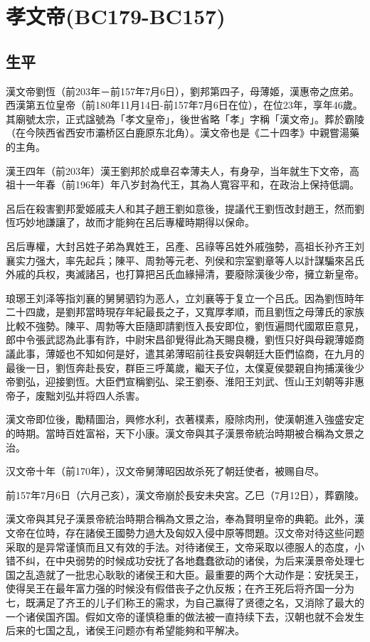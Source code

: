 
\section{孝文帝\tiny(BC179-BC157)}

\subsection{生平}

漢文帝劉恆（前203年－前157年7月6日），劉邦第四子，母薄姬，漢惠帝之庶弟。西漢第五位皇帝（前180年11月14日-前157年7月6日在位），在位23年，享年46歲。其廟號太宗，正式諡號為「孝文皇帝」，後世省略「孝」字稱「漢文帝」。葬於霸陵（在今陝西省西安市灞桥区白鹿原东北角）。漢文帝也是《二十四孝》中親嘗湯藥的主角。

漢王四年（前203年）漢王劉邦於成臯召幸薄夫人，有身孕，当年就生下文帝，高祖十一年春（前196年）年八岁封為代王，其為人寬容平和，在政治上保持低調。

呂后在殺害劉邦愛姬戚夫人和其子趙王劉如意後，提議代王劉恆改封趙王，然而劉恆巧妙地謙讓了，故而才能夠在呂后專權時期得以保命。

呂后專權，大封呂姓子弟為異姓王，呂產、呂祿等呂姓外戚強勢，高祖长孙齐王刘襄实力强大，率先起兵；陳平、周勃等元老、列侯和宗室劉章等人以計謀騙來呂氏外戚的兵权，夷滅諸呂，也打算把呂氏血緣掃清，要廢除漢後少帝，擁立新皇帝。

琅琊王刘泽等指刘襄的舅舅驷钧为恶人，立刘襄等于复立一个吕氏。因為劉恆時年二十四歲，是劉邦當時現存年紀最長之子，又寬厚孝順，而且劉恆之母薄氏的家族比較不強勢。陳平、周勃等大臣隨即請劉恆入長安即位，劉恆遍問代國眾臣意見，郎中令張武認為此事有詐，中尉宋昌卻覺得此為天賜良機，劉恆只好與母親薄姬商議此事，薄姬也不知如何是好，遣其弟薄昭前往長安與朝廷大臣們協商，在九月的最後一日，劉恆奔赴長安，群臣三呼萬歲，繼天子位，太僕夏侯嬰親自拘捕漢後少帝劉弘，迎接劉恆。大臣們宣稱劉弘、梁王劉泰、淮阳王刘武、恆山王刘朝等非惠帝子，废黜刘弘并将四人杀害。

漢文帝即位後，勵精圖治，興修水利，衣著樸素，廢除肉刑，使漢朝進入強盛安定的時期。當時百姓富裕，天下小康。漢文帝與其子漢景帝統治時期被合稱為文景之治。

汉文帝十年（前170年），汉文帝舅薄昭因故杀死了朝廷使者，被赐自尽。

前157年7月6日（六月己亥），漢文帝崩於長安未央宮。乙巳（7月12日），葬霸陵。

漢文帝與其兒子漢景帝統治時期合稱為文景之治，奉為賢明皇帝的典範。此外，漢文帝在位時，存在諸侯王國勢力過大及匈奴入侵中原等問題。汉文帝对待这些问题采取的是异常谨慎而且又有效的手法。对待诸侯王，文帝采取以德服人的态度，小错不纠，在中央弱势的时候成功安抚了各地蠢蠢欲动的诸侯，为后来漢景帝处理七国之乱造就了一批忠心耿耿的诸侯王和大臣。最重要的两个大动作是：安抚吴王，使得吴王在最年富力强的时候没有假借丧子之仇反叛；在齐王死后将齐国一分为七，既满足了齐王的儿子们称王的需求，为自己赢得了贤德之名，又消除了最大的一个诸侯国齐国。假如文帝的谨慎稳重的做法被一直持续下去，汉朝也就不会发生后来的七国之乱，诸侯王问题亦有希望能夠和平解决。

